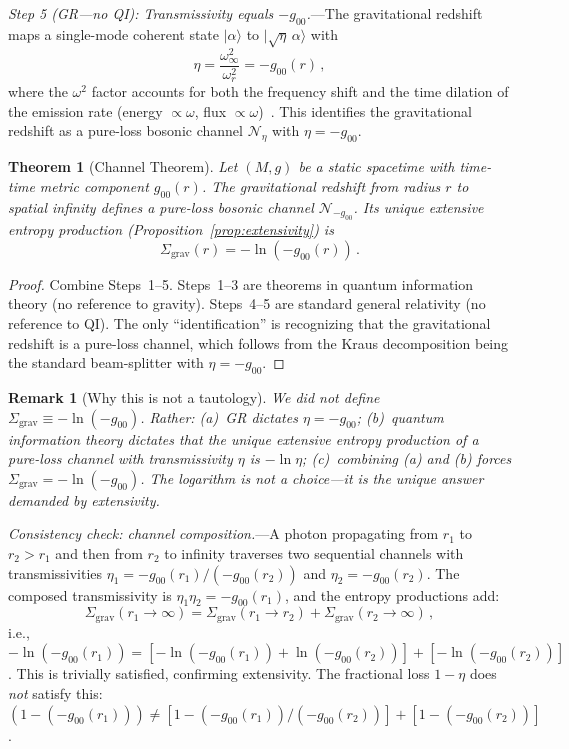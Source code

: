 \documentclass[aps,prd,preprint,superscriptaddress,longbibliography]{revtex4-2}
\newtheorem{theorem}{Theorem}
\newtheorem*{remark}{Remark}
\newcommand{\chan}{\mathcal{N}}
\newcommand{\ket}[1]{|#1\rangle}
\newcommand{\Sgrav}{\Sigma_{\mathrm{grav}}}
\begin{document}
\emph{Step 5 (GR---no QI): Transmissivity equals $-g_{00}$.}---The
gravitational redshift maps a single-mode coherent state
$\ket{\alpha}$ to $\ket{\sqrt{\eta}\,\alpha}$ with
\begin{equation}
  \eta = \frac{\omega_\infty^2}{\omega_r^2} = -g_{00}(r)\,,
  \label{eq:eta}
\end{equation}
where the $\omega^2$ factor accounts for both the frequency shift and
the time dilation of the emission rate (energy $\propto \omega$,
flux $\propto \omega$)~\cite{AhmadiFuentes2014}.
This identifies the gravitational redshift as a pure-loss
bosonic channel $\chan_\eta$ with $\eta = -g_{00}$.

\begin{theorem}[Channel Theorem]
\label{thm:channel}
Let $(M,g)$ be a static spacetime with time-time metric
component $g_{00}(r)$.  The gravitational redshift from
radius $r$ to spatial infinity defines a pure-loss bosonic
channel $\chan_{-g_{00}}$.  Its unique extensive entropy
production (Proposition~\ref{prop:extensivity}) is
\begin{equation}
  \boxed{\Sgrav(r) = -\ln(-g_{00}(r))\,.}
  \label{eq:channel_theorem}
\end{equation}
\end{theorem}
\begin{proof}
Combine Steps~1--5.  Steps~1--3 are theorems in quantum
information theory (no reference to gravity).  Steps~4--5
are standard general relativity (no reference to QI).
The only ``identification'' is recognizing that the
gravitational redshift is a pure-loss channel, which
follows from the Kraus decomposition being the standard
beam-splitter with $\eta = -g_{00}$.
\end{proof}

\begin{remark}[Why this is not a tautology]
We did not \emph{define} $\Sgrav \equiv -\ln(-g_{00})$.
Rather: (a)~GR dictates $\eta = -g_{00}$; (b)~quantum
information theory dictates that the unique extensive
entropy production of a pure-loss channel with
transmissivity $\eta$ is $-\ln\eta$; (c)~combining
(a) and (b) \emph{forces} $\Sgrav = -\ln(-g_{00})$.
The logarithm is not a choice---it is the unique
answer demanded by extensivity.
\end{remark}

\emph{Consistency check: channel composition.}---A photon
propagating from $r_1$ to $r_2 > r_1$ and then from $r_2$
to infinity traverses two sequential channels with
transmissivities $\eta_1 = -g_{00}(r_1)/(-g_{00}(r_2))$ and
$\eta_2 = -g_{00}(r_2)$.  The composed transmissivity is
$\eta_1 \eta_2 = -g_{00}(r_1)$, and the entropy productions
add:
\begin{equation}
  \Sgrav(r_1 \to \infty) = \Sgrav(r_1 \to r_2) + \Sgrav(r_2 \to \infty)\,,
  \label{eq:composition}
\end{equation}
i.e., $-\ln(-g_{00}(r_1)) = [-\ln(-g_{00}(r_1)) + \ln(-g_{00}(r_2))]
+ [-\ln(-g_{00}(r_2))]$.  This is trivially satisfied, confirming
extensivity.  The fractional loss $1-\eta$ does \emph{not} satisfy
this: $(1-(-g_{00}(r_1))) \neq
[1-(-g_{00}(r_1))/(-g_{00}(r_2))] + [1-(-g_{00}(r_2))]$.
\end{document}
